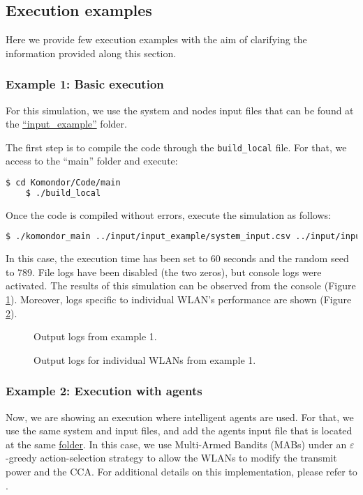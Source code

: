 \documentclass[a4paper]{article}
\begin{document}
\subsection{Execution examples}
\label{section:examples}
Here we provide few execution examples with the aim of clarifying the information provided along this section.

\subsubsection{Example 1: Basic execution}
For this simulation, we use the system and nodes input files that can be found at the \href{https://github.com/wn-upf/Komondor/tree/master/Code/input/input_example}{``input\_example''} folder.

The first step is to compile the code through the \texttt{build\_local} file. For that, we access to the ``main'' folder and execute:
\begin{lstlisting}[language=bash]
	$ cd Komondor/Code/main
	$ ./build_local
\end{lstlisting}

Once the code is compiled without errors, execute the simulation as follows:
\begin{lstlisting}[language=bash]
$ ./komondor_main ../input/input_example/system_input.csv ../input/input_example/nodes_input.csv 0 0 1 1 60 789
\end{lstlisting}

In this case, the execution time has been set to 60 seconds and the random seed to 789. File logs have been disabled (the two zeros), but console logs were activated. The results of this simulation can be observed from the console (Figure \ref{fig:example_1_console_output}). Moreover, logs specific to individual WLAN's performance are shown (Figure \ref{fig:example_1_console_output_wlans}).

\begin{figure}[h!]
	\centering
	\caption{Output logs from example 1.}
	\label{fig:example_1_console_output}
\end{figure}

\begin{figure}[h!]
	\centering
	\caption{Output logs for individual WLANs from example 1.}
	\label{fig:example_1_console_output_wlans}
\end{figure}

\subsubsection{Example 2: Execution with agents}
Now, we are showing an execution where intelligent agents are used. For that, we use the same system and input files, and add the agents input file that is located at the same \href{https://github.com/wn-upf/Komondor/tree/master/Code/input/input_example}{folder}. In this case, we use Multi-Armed Bandits (MABs) under an $\varepsilon$-greedy action-selection strategy to allow the WLANs to modify the transmit power and the CCA. For additional details on this implementation, please refer to \cite{wilhelmi2017collaborative}.
\end{document}
